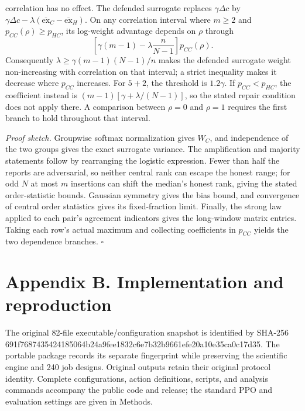\documentclass[
  12pt,
]{article}
\begin{document}
\begin{enumerate}
  correlation has no effect. The defended surrogate replaces
  \(\gamma\Delta c\) by
  \(\gamma\Delta c-\lambda(\overline{\mathrm{ex}}_C-\overline{\mathrm{ex}}_H)\).
  On any correlation interval where \(m\ge2\) and
  \(p_{CC}(\rho)\ge p_{HC}\), its log-weight advantage depends on
  \(\rho\) through \[
  \left[\gamma(m-1)-\lambda\frac{n}{N-1}\right]p_{CC}(\rho).
  \] Consequently \(\lambda\ge\gamma(m-1)(N-1)/n\) makes the defended
  surrogate weight non-increasing with correlation on that interval; a
  strict inequality makes it decrease where \(p_{CC}\) increases. For
  \(5+2\), the threshold is \(1.2\gamma\). If \(p_{CC}<p_{HC}\), the
  coefficient instead is \((m-1)[\gamma+\lambda/(N-1)]\), so the stated
  repair condition does not apply there. A comparison between \(\rho=0\)
  and \(\rho=1\) requires the first branch to hold throughout that
  interval.
\end{enumerate}

\emph{Proof sketch.} Groupwise softmax normalization gives \(W_C\), and
independence of the two groups gives the exact surrogate variance. The
amplification and majority statements follow by rearranging the logistic
expression. Fewer than half the reports are adversarial, so neither
central rank can escape the honest range; for odd \(N\) at most \(m\)
insertions can shift the median's honest rank, giving the stated
order-statistic bounds. Gaussian symmetry gives the bias bound, and
convergence of central order statistics gives its fixed-fraction limit.
Finally, the strong law applied to each pair's agreement indicators
gives the long-window matrix entries. Taking each row's actual maximum
and collecting coefficients in \(p_{CC}\) yields the two dependence
branches. \(\square\)

\FloatBarrier

\section*{Appendix B. Implementation and
reproduction}\label{appendix-b.-implementation-and-reproduction}

The original 82-file executable/configuration snapshot is identified by
SHA-256
691f7687435424185064b24a9fee1832c6e7b32b9661efe20a10e35ca0c17d35. The
portable package records its separate fingerprint while preserving the
scientific engine and 240 job designs. Original outputs retain their
original protocol identity. Complete configurations, action definitions,
scripts, and analysis commands accompany the public code and release;
the standard PPO and evaluation settings are given in Methods.
\end{document}
